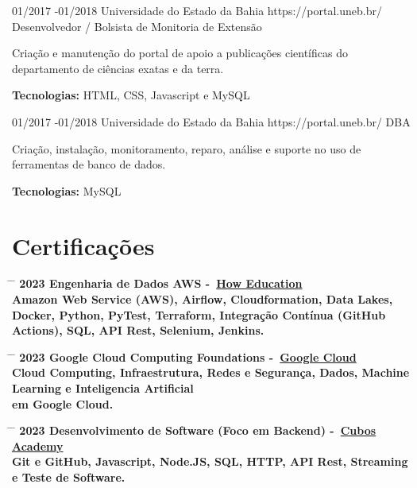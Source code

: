 \documentclass{article}
\begin{document}
\begin{job}
	{01/2017 -}{01/2018}
	{Universidade do Estado da Bahia}
	{https://portal.uneb.br/}
	{Desenvolvedor / Bolsista de Monitoria de Extensão}%
	{Criação e manutenção do portal de apoio a publicações científicas do departamento de ciências exatas e da terra.\\
		\rule{0mm}{5mm}\textbf{Tecnologias:} HTML, CSS, Javascript e
		MySQL}
\end{job}

\begin{job}
	{01/2017 -}{01/2018}
	{Universidade do Estado da Bahia}
	{https://portal.uneb.br/}
	{DBA}%
	{Criação, instalação, monitoramento, reparo, análise e suporte no uso de ferramentas de banco de dados.\\
		\rule{0mm}{5mm}\textbf{Tecnologias:} MySQL}
\end{job}

\section*{Certificações}

\begin{tabbing}
	\hspace{2cm} \= \hspace{4cm} \= \kill
	\bf{2023} \> Engenharia de Dados AWS
	-~\href{https://howedu.com.br/}{How Education} \\
	Amazon Web Service (AWS), Airflow, Cloudformation, Data Lakes, Docker, Python, PyTest, Terraform, Integração Contínua (GitHub\\ Actions), SQL, API Rest, Selenium, Jenkins. \\
\end{tabbing}

\begin{tabbing}
	\hspace{2cm} \= \hspace{4cm} \= \kill
	\bf{2023} \> Google Cloud Computing Foundations
	-~\href{https://www.cloudskillsboost.google/public_profiles/3a03b48f-00f0-42a3-9800-4c045d78b21e/badges/3540421}{Google
		Cloud} \\
	Cloud Computing, Infraestrutura, Redes e Segurança, Dados, Machine Learning e Inteligencia Artificial\\ em Google Cloud. \\
\end{tabbing}

\begin{tabbing}
	\hspace{2cm} \= \hspace{4cm} \= \kill
	\bf{2023} \> Desenvolvimento de Software (Foco em Backend)
	-~\href{https://cubos.academy/}{Cubos Academy} \\
	Git e GitHub, Javascript, Node.JS, SQL, HTTP, API Rest, Streaming e Teste de Software. \\
\end{tabbing}
\end{document}
